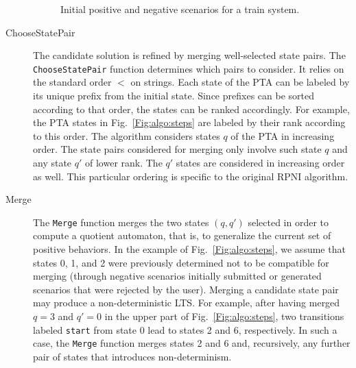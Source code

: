 \begin{description}
\begin{figure}
\caption{Initial positive and negative scenarios for a train system\label{Fig:init:scen}.}
\end{figure}

\item[ChooseStatePair] The candidate solution is refined by merging well-selected state pairs. The \texttt{ChooseStatePair} function determines which pairs to consider. It relies on the standard order $<$ on strings. Each state of the PTA can be labeled by its unique prefix from the initial state. Since prefixes can be sorted according to that order, the states can be ranked accordingly. For example, the PTA states in Fig.~\ref{Fig:algo:steps} are labeled by their rank according to this order. The algorithm considers states $q$ of the PTA in increasing order. The state pairs considered for merging only involve such state $q$ and any state $q'$ of lower rank. The $q'$ states are considered in increasing order as well. This particular ordering is specific to the original RPNI algorithm.

\item[Merge] The \texttt{Merge} function merges the two states $(q, q')$ selected in order to compute a quotient automaton, that is, to generalize the current set of positive behaviors. In the example of Fig.~\ref{Fig:algo:steps}, we assume that states 0, 1, and 2 were previously determined not to be compatible for merging (through negative scenarios initially submitted or generated scenarios that were rejected by the user). Merging a candidate state pair may produce a non-deterministic LTS. For example, after having merged $q = 3$ and $q' = 0$ in the upper part of Fig.~\ref{Fig:algo:steps}, two transitions labeled \texttt{start} from state 0 lead to states 2 and 6, respectively. In such a case, the \texttt{Merge} function merges states 2 and 6 and, recursively, any further pair of states that introduces non-determinism. 


\end{description}
